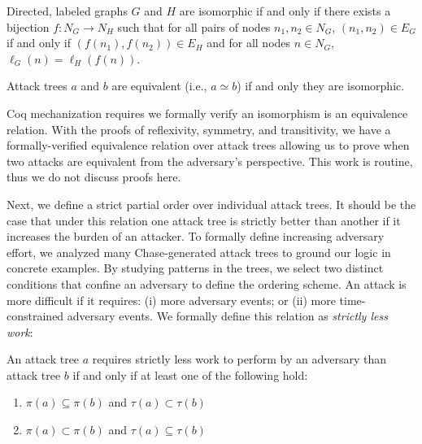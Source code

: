 \documentclass[runningheads]{llncs}
\theoremstyle{definition}
\newcommand{\squash}{\itemsep=0pt\parskip=0pt}
\begin{document}
\begin{definition}[Isomorphism]
  Directed, labeled graphs $G$ and $H$ are isomorphic if and only if
  there exists a bijection $f : N_G \to N_H$ such that for all pairs
  of nodes $n_1, n_2 \in N_G$, $(n_1,n_2) \in E_G$ if and only if
  $(f(n_1),f(n_2)) \in E_H$ and for all nodes $n \in N_G$,
  $\ell_G(n) = \ell_H(f(n))$. 
\end{definition}

\begin{definition}
  Attack trees $a$ and $b$ are equivalent (i.e., $a \simeq b$) if and
  only they are isomorphic. 
\end{definition}

Coq mechanization requires we formally verify an isomorphism
is an equivalence relation.  With the proofs of reflexivity, symmetry,
and transitivity, we have a formally-verified equivalence relation
over attack trees allowing us to prove when two attacks are equivalent
from the adversary's perspective. This work is routine, thus we do not 
discuss proofs here.

Next, we define a strict partial order over individual attack
trees. It should be the case that under this relation one attack tree
is strictly better than another if it increases the burden of an
attacker. To formally define increasing adversary effort, we
analyzed many Chase-generated attack trees to ground our logic in
concrete examples. By studying patterns in the trees, we select two
distinct conditions that confine an adversary to define the ordering
scheme.  An attack is more difficult if it requires: (i) more
adversary events; or (ii) more time-constrained adversary events. We
formally define this relation as \emph{strictly less work}:

\begin{definition}
  An attack tree $a$ requires strictly less work to perform by an
  adversary than attack tree $b$ if and only if at least one of the
  following hold:  
\begin{enumerate}
  \squash
  \item $\pi(a) \subseteq \pi(b)$ and $\tau(a) \subset \tau(b)$
  \item $\pi(a) \subset \pi(b)$ and $\tau(a) \subseteq \tau(b)$
\end{enumerate}
\end{definition}
\end{document}
